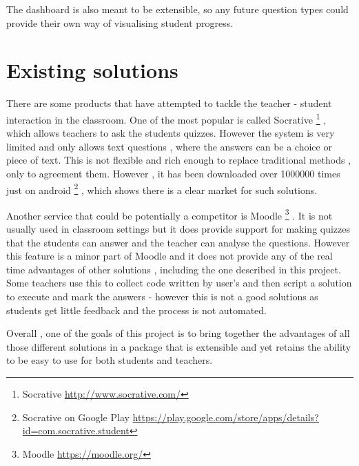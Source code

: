 The dashboard is also meant to be extensible, so any future question types could provide their own way of visualising student progress.

\section{Existing solutions}
There are some products that have attempted to tackle the teacher - student interaction in the classroom.
One of the most popular is called Socrative \footnote{Socrative \url{http://www.socrative.com/}} , which allows teachers to ask the students quizzes. However the system is very limited and only allows text questions , where the answers can be a choice or piece of text. This is not flexible and rich enough to replace traditional methods , only to agreement them. However , it has been downloaded over 1000000 times just on android \footnote{Socrative on Google Play \url{https://play.google.com/store/apps/details?id=com.socrative.student}} , which shows there is a clear market for such solutions.

Another service that could be potentially a competitor is Moodle \footnote{Moodle \url{https://moodle.org/}} . It is not usually used in classroom settings but it does provide support for making quizzes that the students can answer and the teacher can analyse the questions. However this feature is a minor part of Moodle and it does not provide any of the real time advantages of other solutions , including the one described in this project. Some teachers use this to collect code written by user's and then script a solution to execute and mark the answers - however this is not a good solutions as students get little feedback and the process is not automated.

Overall , one of the goals of this project is to bring together the advantages of all those different solutions in a package that is extensible and yet retains the ability to be easy to use for both students and teachers.



